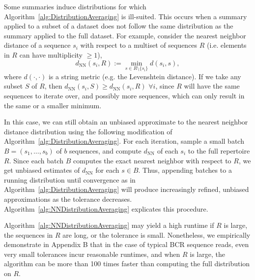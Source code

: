 \documentclass{article}
\begin{document}
Some summaries induce distributions for which Algorithm~\ref{alg:DistributionAveraging} is ill-suited.
This occurs when a summary applied to a subset of a dataset does not follow the same distribution as the summary applied to the full dataset.
For example, consider the nearest neighbor distance of a sequence $s_i$ with respect to a multiset of sequences $R$ (i.e. elements in $R$ can have multiplicity $\ge 1$),
\begin{equation}
d_\text{NN}(s_i, R) := \min_{s \in R \setminus \{s_i\}} d(s_i, s),
\end{equation}
where $d(\cdot, \cdot)$ is a string metric (e.g. the Levenshtein distance).
If we take any subset $S$ of $R$, then $d_\text{NN}(s_i, S) \ge d_\text{NN}(s_i, R)$ $\forall i$, since $R$ will have the same sequences to iterate over, and possibly more sequences, which can only result in the same or a smaller minimum.


In this case, we can still obtain an unbiased approximate to the nearest neighbor distance distribution using the following modification of Algorithm~\ref{alg:DistributionAveraging}.
For each iteration, sample a small batch $B = (s_1, \dotsc, s_b)$ of $b$ sequences, and compute $d_\text{NN}$ of each $s_i$ to the full repertoire $R$.
Since each batch $B$ computes the exact nearest neighbor with respect to $R$, we get unbiased estimates of $d_\text{NN}$ for each $s \in B$.
Thus, appending batches to a running distribution until convergence as in Algorithm~\ref{alg:DistributionAveraging} will produce increasingly refined, unbiased approximations as the tolerance decreases.
Algorithm~\ref{alg:NNDistributionAveraging} explicates this procedure.

Algorithm~\ref{alg:NNDistributionAveraging} may yield a high runtime if $R$ is large, the sequences in $R$ are long, or the tolerance is small.
Nonetheless, we empirically demonstrate in Appendix B that in the case of typical BCR sequence reads, even very small tolerances incur reasonable runtimes, and when $R$ is large, the algorithm can be more than 100 times faster than computing the full distribution on $R$.
\end{document}
